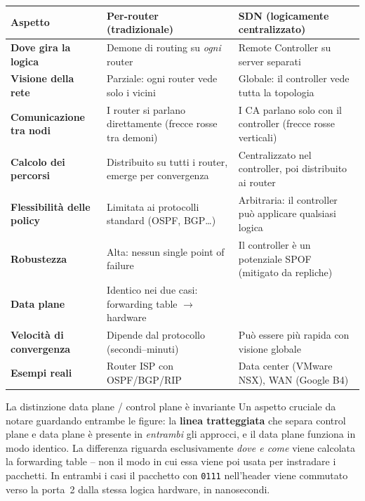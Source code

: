 \documentclass[a4paper,12pt]{report}
\begin{document}
\begin{table}[H]
\centering
\label{tab:cp_comparison}
\begin{tabularx}{\textwidth}{lXX}
\toprule
\textbf{Aspetto}
    & \textbf{Per-router (tradizionale)}
    & \textbf{SDN (logicamente centralizzato)} \\
\midrule
\textbf{Dove gira la logica}
    & Demone di routing su \emph{ogni} router
    & Remote Controller su server separati \\
\addlinespace
\textbf{Visione della rete}
    & Parziale: ogni router vede solo i vicini
    & Globale: il controller vede tutta la topologia \\
\addlinespace
\textbf{Comunicazione tra nodi}
    & I router si parlano direttamente (frecce rosse tra demoni)
    & I CA parlano solo con il controller (frecce rosse verticali) \\
\addlinespace
\textbf{Calcolo dei percorsi}
    & Distribuito su tutti i router, emerge per convergenza
    & Centralizzato nel controller, poi distribuito ai router \\
\addlinespace
\textbf{Flessibilità delle policy}
    & Limitata ai protocolli standard (OSPF, BGP\ldots)
    & Arbitraria: il controller può applicare qualsiasi logica \\
\addlinespace
\textbf{Robustezza}
    & Alta: nessun single point of failure
    & Il controller è un potenziale SPOF (mitigato da repliche) \\
\addlinespace
\textbf{Data plane}
    & Identico nei due casi: forwarding table $\to$ hardware  \\
\addlinespace
\textbf{Velocità di convergenza}
    & Dipende dal protocollo (secondi--minuti)
    & Può essere più rapida con visione globale \\
\addlinespace
\textbf{Esempi reali}
    & Router ISP con OSPF/BGP/RIP
    & Data center (VMware NSX), WAN (Google B4) \\
\bottomrule
\end{tabularx}
\end{table}

\begin{urgentbox}{La distinzione data plane / control plane è invariante}
Un aspetto cruciale da notare guardando entrambe le figure: la
\textbf{linea tratteggiata} che separa control plane e data plane è
presente in \emph{entrambi} gli approcci, e il data plane funziona in modo
identico. La differenza riguarda esclusivamente \emph{dove e come} viene
calcolata la forwarding table -- non il modo in cui essa viene poi usata
per instradare i pacchetti. In entrambi i casi il pacchetto con
\texttt{0111} nell'header viene commutato verso la porta~2 dalla stessa
logica hardware, in nanosecondi.
\end{urgentbox}
\end{document}
